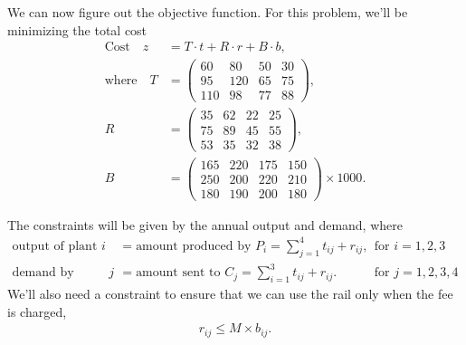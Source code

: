 \documentclass{homework}
\begin{document}
\begin{enumerate}
		We can now figure out the objective function. For this problem, we'll be minimizing the total cost \begin{align*}
			\mathrm{Cost} \quad z & = T\cdot t + R \cdot r + B \cdot b, \\
			\mathrm{where} \quad T & = \begin{pmatrix}
				60 & 80 & 50 & 30 \\
				95 & 120 & 65 & 75 \\
				110 & 98 & 77 & 88
			\end{pmatrix}, \\
			R & = \begin{pmatrix}
				35 & 62 & 22 & 25 \\
				75 & 89 & 45 & 55 \\
				53 & 35 & 32 & 38
			\end{pmatrix}, \\
			B & = \begin{pmatrix}
				165 & 220 & 175 & 150 \\
				250 & 200 & 220 & 210 \\
				180 & 190 & 200 & 180
			\end{pmatrix} \times 1000.
		\end{align*}
	
		The constraints will be given by the annual output and demand, where \begin{align*}
			\text{output of plant $i$} & = \text{amount produced by $P_i$} = \sum_{j=1}^4 t_{ij} + r_{ij}, && \text{for $i=1, 2, 3$}\\
			\text{demand by center $j$} & = \text{amount sent to $C_j$} = \sum_{i=1}^3 t_{ij} + r_{ij}. && \text{for $j=1, 2, 3, 4$}
		\end{align*}
		We'll also need a constraint to ensure that we can use the rail only when the fee is charged, 
		\begin{align*}
			r_{ij} \le M \times b_{ij}.
		\end{align*}
		

\end{enumerate}
\end{document}
